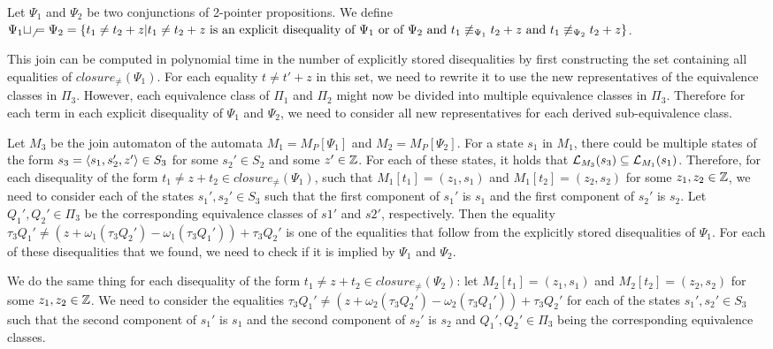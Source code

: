 \begin{definition}
    Let $\Psi_1$ and $\Psi_2$ be two conjunctions of 2-pointer propositions. We define $\Psi_1 \sqcup_\neq \Psi_2 = \{t_1 \neq t_2 + z | t_1 \neq t_2 + z \text{ is an explicit disequality of } \Psi_1 \text{ or of } \Psi_2 \text{ and } t_1 \not\equiv_{\Psi_1} t_2 + z \text{ and } t_1 \not\equiv_{\Psi_2} t_2 + z\}$.
\end{definition}

This join can be computed in polynomial time in the number of explicitly stored disequalities by first constructing the set containing all equalities of $closure_\neq(\Psi_1)$.
For each equality $t \neq t' + z$ in this set, we need to rewrite it to use the new representatives of the equivalence classes in $\Pi_3$.
However, each equivalence class of $\Pi_1$ and $\Pi_2$ might now be divided into multiple equivalence classes in $\Pi_3$.
Therefore for each term in each explicit disequality of $\Psi_1$ and $\Psi_2$, we need to consider all new representatives for each derived sub-equivalence class.

Let $M_3$ be the join automaton of the automata $M_1 = M_P[\Psi_1]$ and $M_2 = M_P[\Psi_2]$.
For a state $s_1$ in $M_1$, there could be multiple states of the form $s_3 = \langle s_1, s_2', z'\rangle \in S_3$ for some $s_2' \in S_2$ and some $z' \in \mathbb{Z}$.
For each of these states, it holds that $\mathcal{L}_{M_3}(s_3) \subseteq \mathcal{L}_{M_1}(s_1)$.
Therefore, for each disequality of the form $t_1 \neq z + t_2 \in closure_\neq(\Psi_1)$, such that $M_1[t_1] = (z_1, s_1)$ and $M_1[t_2] = (z_2, s_2)$ for some $z_1,z_2\in \mathbb{Z}$, we need to consider
each of the states $s_1', s_2' \in S_3$ such that the first component of $s_1'$ is $s_1$ and the first component of $s_2'$ is $s_2$. Let $Q_1', Q_2' \in \Pi_3$ be the corresponding equivalence classes of $s1'$ and $s2'$, respectively.
Then the equality $\tau_3 Q_1' \neq (z + \omega_1 (\tau_3 Q_2') - \omega_1 (\tau_3 Q_1')) +\tau_3 Q_2'$ is one of the equalities that follow from the explicitly stored disequalities of $\Psi_1$.
For each of these disequalities that we found, we need to check if it is implied by $\Psi_1$ and $\Psi_2$.

We do the same thing for each disequality of the form $t_1 \neq z + t_2 \in closure_\neq(\Psi_2)$:
let $M_2[t_1] = (z_1, s_1)$ and $M_2[t_2] = (z_2, s_2)$ for some $z_1,z_2\in \mathbb{Z}$.
We need to consider the equalities $\tau_3 Q_1' \neq (z + \omega_2 (\tau_3 Q_2') - \omega_2 (\tau_3 Q_1')) +\tau_3 Q_2'$ for each of the states $s_1', s_2' \in S_3$ such that the second component of $s_1'$ is $s_1$ and the second component of $s_2'$ is $s_2$ and $Q_1', Q_2' \in \Pi_3$ being the corresponding equivalence classes.

